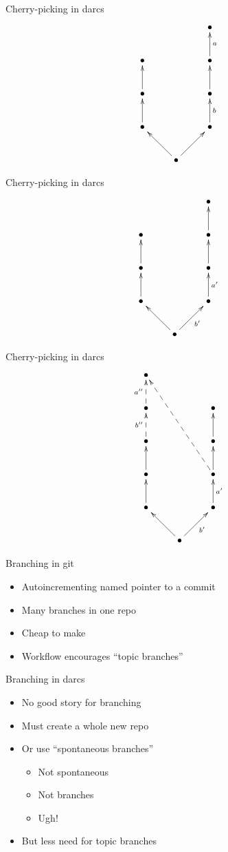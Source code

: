 \documentclass[pdf]{prosper}
\begin{document}
\begin{slide}{Cherry-picking in darcs}
\[
\xymatrix{
	&& \bullet \\
	\bullet && \bullet \ar[u]_a \\
	\bullet \ar[u] && \bullet \ar[u] \\
	\bullet \ar[u] && \bullet \ar[u]_b \\
	& \bullet \ar[ul] \ar[ur]
}
\]
\end{slide}

\begin{slide}{Cherry-picking in darcs}
\[
\xymatrix{
	&& \bullet \\
	\bullet && \bullet \ar[u] \\
	\bullet \ar[u] && \bullet \ar[u]_{} \\
	\bullet \ar[u] && \bullet \ar[u]_{a'} \\
	& \bullet \ar[ul] \ar[ur]_{b'}
}
\]
\end{slide}

\begin{slide}{Cherry-picking in darcs}
\[
\xymatrix{
	\bullet \\
	\bullet \ar@{-->}[u]^{a''} && \bullet \\
	\bullet \ar@{-->}[u]^{b''} && \bullet \ar[u] \\
	\bullet \ar[u] && \bullet \ar[u] \ar@{-->}[uuull] \\
	\bullet \ar[u] && \bullet \ar[u]_{a'} \\
	& \bullet \ar[ul] \ar[ur]_{b'}
}
\]
\end{slide}


\begin{slide}{Branching in git}
\begin{itemize}
\item Autoincrementing named pointer to a commit
\item Many branches in one repo
\item Cheap to make
\item Workflow encourages ``topic branches''
\end{itemize}
\end{slide}

\begin{slide}{Branching in darcs}
\begin{itemize}
\item No good story for branching
\item Must create a whole new repo
\item Or use ``spontaneous branches''
\begin{itemize}
\item Not spontaneous
\item Not branches
\item Ugh!
\end{itemize}
\item But less need for topic branches
\end{itemize}
\end{slide}
\end{document}
